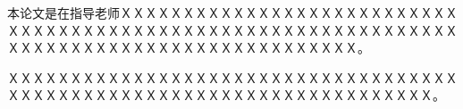 \begin{acknowledge}
    本论文是在指导老师ＸＸＸＸＸＸＸＸＸＸＸＸＸＸＸＸＸＸＸＸＸＸＸＸＸＸＸＸＸＸＸＸＸＸＸＸＸＸＸＸＸＸＸＸＸＸＸＸＸＸＸＸＸＸＸＸＸＸＸＸＸＸＸＸＸＸＸＸＸＸＸＸＸＸＸＸＸＸＸＸＸＸＸＸＸＸＸＸＸＸＸ。
    
    ＸＸＸＸＸＸＸＸＸＸＸＸＸＸＸＸＸＸＸＸＸＸＸＸＸＸＸＸＸＸＸＸＸＸＸＸＸＸＸＸＸＸＸＸＸＸＸＸＸＸＸＸＸＸＸＸＸＸＸＸＸＸＸＸＸＸＸＸＸＸ。
\end{acknowledge}
